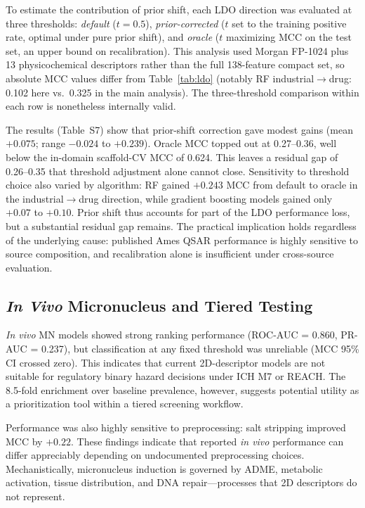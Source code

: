 \documentclass[journal=jacsat,manuscript=article]{achemso}
\begin{document}
To estimate the contribution of prior shift, each LDO direction was evaluated at three 
thresholds: \textit{default} ($t = 0.5$), \textit{prior-corrected} ($t$ set to the 
training positive rate, optimal under pure prior shift), and \textit{oracle} ($t$ 
maximizing MCC on the test set, an upper bound on recalibration). This analysis used 
Morgan FP-1024 plus 13 physicochemical descriptors rather than the full 138-feature compact 
set, so absolute MCC values differ from Table~\ref{tab:ldo} (notably RF 
industrial$\to$drug: 0.102 here vs.\ 0.325 in the main analysis). The three-threshold 
comparison within each row is nonetheless internally valid.

The results (Table~S7) show that prior-shift correction gave modest gains (mean $+0.075$; 
range $-0.024$ to $+0.239$). Oracle MCC topped out at 0.27--0.36, well below the in-domain 
scaffold-CV MCC of 0.624. This leaves a residual gap of 0.26--0.35 that threshold 
adjustment alone cannot close. Sensitivity to threshold choice also varied by algorithm: 
RF gained $+0.243$ MCC from default to oracle in the industrial$\to$drug direction, while 
gradient boosting models gained only $+0.07$ to $+0.10$. Prior shift thus accounts for 
part of the LDO performance loss, but a substantial residual gap remains. The practical 
implication holds regardless of the underlying cause: published Ames QSAR performance is highly 
sensitive to source composition, and recalibration alone is insufficient under cross-source 
evaluation.

\subsection{\textit{In Vivo} Micronucleus and Tiered Testing}

\textit{In vivo} MN models showed strong ranking performance (ROC-AUC = 0.860, PR-AUC = 0.237), 
but classification at any fixed threshold was unreliable (MCC 95\% CI crossed zero). This 
indicates that current 2D-descriptor models are not suitable for regulatory binary hazard 
decisions under ICH M7\cite{ICH_M7_2017} or REACH.\cite{EU_REACH_2006} The 8.5-fold 
enrichment over baseline prevalence, however, suggests potential utility as a prioritization 
tool within a tiered screening workflow.\cite{Dobo_2012}

Performance was also highly sensitive to preprocessing: salt stripping improved MCC by 
$+0.22$. These findings indicate that reported \textit{in vivo} performance can differ appreciably depending 
on undocumented preprocessing choices.\cite{Fourches_2016} Mechanistically, micronucleus 
induction is governed by ADME, metabolic activation, tissue distribution, and DNA 
repair\cite{Tweats_2007,Kirkland_2011}---processes that 2D descriptors do not represent.
\end{document}
